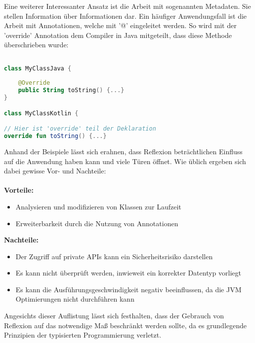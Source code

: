 \bigskip
Eine weiterer Interessanter Ansatz ist die Arbeit mit sogenannten Metadaten. Sie stellen Information über Informationen dar. Ein häufiger Anwendungsfall ist die Arbeit mit Annotationen, welche mit '@' eingeleitet werden. So wird mit der 'override' Annotation dem Compiler in Java mitgeteilt, dass diese Methode überschrieben wurde:
\begin{lstlisting}[caption={Override Annotation}, label={lst:data-class}, language=Kotlin]

class MyClassJava {
	
	@Override
	public String toString() {...}
}

class MyClassKotlin {

// Hier ist 'override' teil der Deklaration
override fun toString() {...}
\end{lstlisting}
\bigskip
Anhand der Beispiele lässt sich erahnen, dass Reflexion beträchtlichen Einfluss auf die Anwendung haben kann und viele Türen öffnet. Wie üblich ergeben sich dabei gewisse Vor- und Nachteile:
\\
\\
\textbf{Vorteile:}
\begin{itemize}
	\item Analysieren und modifizieren von Klassen zur Laufzeit
	\item Erweiterbarkeit durch die Nutzung von Annotationen 
\end{itemize}
\textbf{Nachteile:}
\begin{itemize}
	\item Der Zugriff auf private APIs kann ein Sicherheitsrisiko darstellen
	\item Es kann nicht überprüft werden, inwieweit ein korrekter Datentyp vorliegt
	\item Es kann die Ausführungsgeschwindigkeit negativ beeinflussen, da die JVM Optimierungen nicht durchführen kann 
\end{itemize}
Angesichts dieser Auflistung lässt sich festhalten, dass der Gebrauch von Reflexion auf das notwendige Maß beschränkt werden sollte, da es grundlegende Prinzipien der typisierten Programmierung verletzt.

